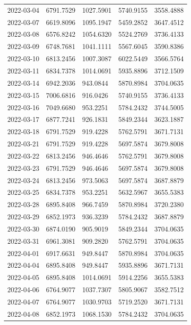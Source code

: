 \begin{footnotesize}
\begin{longtable}{lllll}
2022-03-04 & 6791.7529 & 1027.5901 & 5740.9155 & 3558.4888 \\
2022-03-07 & 6619.8096 & 1095.1947 & 5459.2852 & 3647.4512 \\
2022-03-08 & 6576.8242 & 1054.6320 & 5524.2769 & 3736.4133 \\
2022-03-09 & 6748.7681 & 1041.1111 & 5567.6045 & 3590.8386 \\
2022-03-10 & 6813.2456 & 1007.3087 & 6022.5449 & 3566.5764 \\
2022-03-11 & 6834.7378 & 1014.0691 & 5935.8896 & 3712.1509 \\
2022-03-14 & 6942.2036 & 943.0844 & 5870.8984 & 3704.0635 \\
2022-03-15 & 7006.6816 & 916.0426 & 5740.9155 & 3736.4133 \\
2022-03-16 & 7049.6680 & 953.2251 & 5784.2432 & 3744.5005 \\
2022-03-17 & 6877.7241 & 926.1831 & 5849.2344 & 3623.1887 \\
2022-03-18 & 6791.7529 & 919.4228 & 5762.5791 & 3671.7131 \\
2022-03-21 & 6791.7529 & 919.4228 & 5697.5874 & 3679.8008 \\
2022-03-22 & 6813.2456 & 946.4646 & 5762.5791 & 3679.8008 \\
2022-03-23 & 6791.7529 & 946.4646 & 5697.5874 & 3679.8008 \\
2022-03-24 & 6813.2456 & 973.5063 & 5697.5874 & 3687.8879 \\
2022-03-25 & 6834.7378 & 953.2251 & 5632.5967 & 3655.5383 \\
2022-03-28 & 6895.8408 & 966.7459 & 5870.8984 & 3720.2380 \\
2022-03-29 & 6852.1973 & 936.3239 & 5784.2432 & 3687.8879 \\
2022-03-30 & 6874.0190 & 905.9019 & 5849.2344 & 3704.0635 \\
2022-03-31 & 6961.3081 & 909.2820 & 5762.5791 & 3704.0635 \\
2022-04-01 & 6917.6631 & 949.8447 & 5870.8984 & 3704.0635 \\
2022-04-04 & 6895.8408 & 949.8447 & 5935.8896 & 3671.7131 \\
2022-04-05 & 6895.8408 & 1014.0691 & 5914.2256 & 3655.5383 \\
2022-04-06 & 6764.9077 & 1037.7307 & 5805.9067 & 3582.7512 \\
2022-04-07 & 6764.9077 & 1030.9703 & 5719.2520 & 3671.7131 \\
2022-04-08 & 6852.1973 & 1068.1530 & 5784.2432 & 3704.0635 \\

\end{longtable}
\end{footnotesize}
